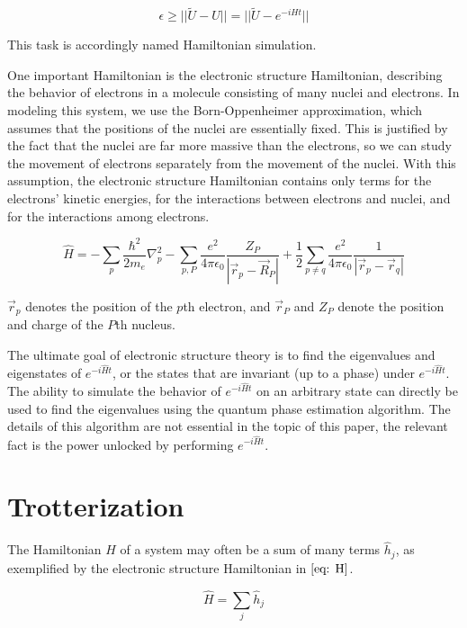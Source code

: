 \begin{equation}
    \epsilon \geq ||\tilde{U} - U|| = ||\tilde{U} - e^{-iHt}||
\end{equation}

This task is accordingly named Hamiltonian simulation.

One important Hamiltonian is the electronic structure Hamiltonian, describing the behavior of electrons in a molecule consisting of many nuclei and electrons. In modeling this system, we use the Born-Oppenheimer approximation, which assumes that the positions of the nuclei are essentially fixed. This is justified by the fact that the nuclei are far more massive than the electrons, so we can study the movement of electrons separately from the movement of the nuclei. With this assumption, the electronic structure Hamiltonian contains only terms for the electrons' kinetic energies, for the interactions between electrons and nuclei, and for the interactions among electrons.

\begin{equation}
    \hat{H} = -\sum_p \frac{\hbar^2}{2m_e} \nabla^2_p - \sum_{p, P}\frac{e^2}{4\pi\epsilon_0}\frac{Z_P}{|\vec{r}_p - \vec{R}_P|} + \frac{1}{2}\sum_{p \neq q}\frac{e^2}{4\pi\epsilon_0}\frac{1}{|\vec{r}_p - \vec{r}_q|} \label{eq: H}
\end{equation}

$\vec{r}_p$ denotes the position of the $p$th electron, and $\vec{r}_P$ and $Z_P$ denote the position and charge of the $P$th nucleus.

The ultimate goal of electronic structure theory is to find the eigenvalues and eigenstates of $e^{-i\hat{H}t}$, or the states that are invariant (up to a phase) under $e^{-i\hat{H}t}$. The ability to simulate the behavior of $e^{-i\hat{H}t}$ on an arbitrary state can directly be used to find the eigenvalues using the quantum phase estimation algorithm. The details of this algorithm are not essential in the topic of this paper, the relevant fact is the power unlocked by performing $e^{-i\hat{H}t}$.

\section{Trotterization}

The Hamiltonian $H$ of a system may often be a sum of many terms $\hat{h}_j$, as exemplified by the electronic structure Hamiltonian in $\eqref{eq: H}$.

\begin{equation}
    \hat{H} = \sum_j \hat{h}_j
\end{equation}

